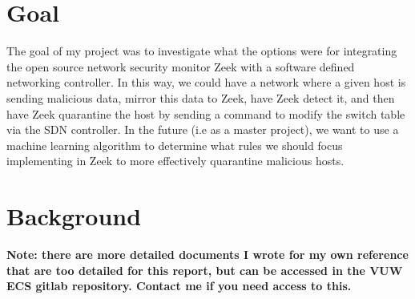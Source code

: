 \documentclass{article}
\begin{document}
\section{Goal}
The goal of my project was to investigate what the options were for integrating the open source network security monitor Zeek with a software defined networking controller. In this way, we could have a network where a given host is sending malicious data, mirror this data to Zeek, have Zeek detect it, and then have Zeek quarantine the host by sending a command to modify the switch table via the SDN controller. In the future (i.e as a master project), we want to use a machine learning algorithm to determine what rules we should focus implementing in Zeek to more effectively quarantine malicious hosts.
\section{Background}
\textbf{Note: there are more detailed documents I wrote for my own reference that are too detailed for this report, but can be accessed in the VUW ECS gitlab repository. Contact me if you need access to this.}
\end{document}
